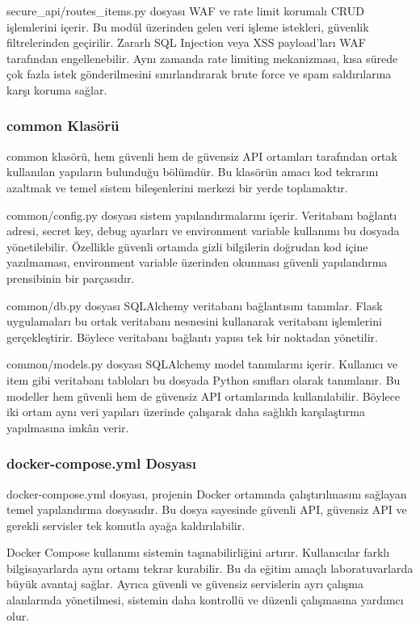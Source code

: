 secure\_api/routes\_items.py dosyası WAF ve rate limit korumalı CRUD işlemlerini içerir. Bu modül üzerinden gelen veri işleme istekleri, güvenlik filtrelerinden geçirilir. Zararlı SQL Injection veya XSS payload’ları WAF tarafından engellenebilir. Aynı zamanda rate limiting mekanizması, kısa sürede çok fazla istek gönderilmesini sınırlandırarak brute force ve spam saldırılarına karşı koruma sağlar.

\subsubsection{common Klasörü}

common klasörü, hem güvenli hem de güvensiz API ortamları tarafından ortak kullanılan yapıların bulunduğu bölümdür. Bu klasörün amacı kod tekrarını azaltmak ve temel sistem bileşenlerini merkezi bir yerde toplamaktır.

common/config.py dosyası sistem yapılandırmalarını içerir. Veritabanı bağlantı adresi, secret key, debug ayarları ve environment variable kullanımı bu dosyada yönetilebilir. Özellikle güvenli ortamda gizli bilgilerin doğrudan kod içine yazılmaması, environment variable üzerinden okunması güvenli yapılandırma prensibinin bir parçasıdır.

common/db.py dosyası SQLAlchemy veritabanı bağlantısını tanımlar. Flask uygulamaları bu ortak veritabanı nesnesini kullanarak veritabanı işlemlerini gerçekleştirir. Böylece veritabanı bağlantı yapısı tek bir noktadan yönetilir.

common/models.py dosyası SQLAlchemy model tanımlarını içerir. Kullanıcı ve item gibi veritabanı tabloları bu dosyada Python sınıfları olarak tanımlanır. Bu modeller hem güvenli hem de güvensiz API ortamlarında kullanılabilir. Böylece iki ortam aynı veri yapıları üzerinde çalışarak daha sağlıklı karşılaştırma yapılmasına imkân verir.

\subsubsection{docker-compose.yml Dosyası}

docker-compose.yml dosyası, projenin Docker ortamında çalıştırılmasını sağlayan temel yapılandırma dosyasıdır. Bu dosya sayesinde güvenli API, güvensiz API ve gerekli servisler tek komutla ayağa kaldırılabilir.

Docker Compose kullanımı sistemin taşınabilirliğini artırır. Kullanıcılar farklı bilgisayarlarda aynı ortamı tekrar kurabilir. Bu da eğitim amaçlı laboratuvarlarda büyük avantaj sağlar. Ayrıca güvenli ve güvensiz servislerin ayrı çalışma alanlarında yönetilmesi, sistemin daha kontrollü ve düzenli çalışmasına yardımcı olur.

